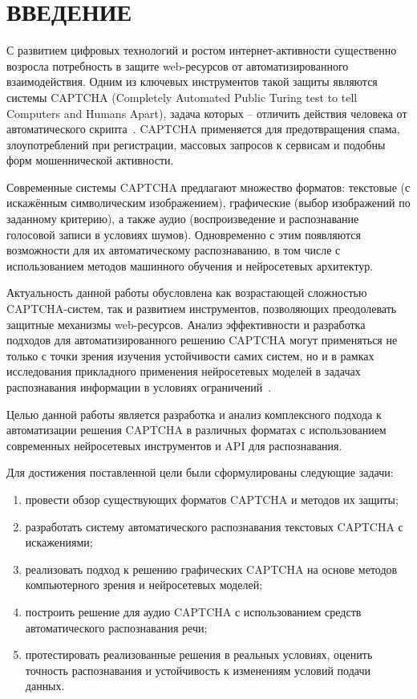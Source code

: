 \chapter*{ВВЕДЕНИЕ}

С развитием цифровых технологий и ростом интернет-активности существенно возросла 
потребность в защите web-ресурсов от автоматизированного взаимодействия. Одним 
из ключевых инструментов такой защиты являются системы CAPTCHA (Completely 
Automated Public Turing test to tell Computers and Humans Apart), задача которых 
-- отличить действия человека от автоматического скрипта~\cite{captchawiki}. 
CAPTCHA применяется для предотвращения спама, злоупотреблений при регистрации, 
массовых запросов к сервисам и подобны форм мошеннической активности.

Современные системы CAPTCHA предлагают множество форматов: текстовые (с 
искажённым символическим изображением), графические (выбор изображений по 
заданному критерию), а также аудио (воспроизведение и распознавание голосовой 
записи в условиях шумов). Одновременно с этим появляются возможности для их 
автоматическому распознаванию, в том числе с использованием методов 
машинного обучения и нейросетевых архитектур.

Актуальность данной работы обусловлена как возрастающей сложностью 
CAPTCHA-систем, так и развитием инструментов, позволяющих преодолевать защитные 
механизмы web-ресурсов. Анализ эффективности и разработка подходов для 
автоматизированного решению CAPTCHA могут применяться не только с точки зрения 
изучения устойчивости самих систем, но и в рамках исследования прикладного 
применения нейросетевых моделей в задачах распознавания информации в условиях 
ограничений~\cite{captchatrouble2}.

Целью данной работы является разработка и анализ комплексного подхода к 
автоматизации решения CAPTCHA в различных форматах с использованием современных 
нейросетевых инструментов и API для распознавания.

Для достижения поставленной цели были сформулированы следующие задачи:

\begin{enumerate}
    \item провести обзор существующих форматов CAPTCHA и методов их защиты;
    \item разработать систему автоматического распознавания текстовых CAPTCHA с 
    искажениями;
    \item реализовать подход к решению графических CAPTCHA на основе методов 
    компьютерного зрения и нейросетевых моделей;
    \item построить решение для аудио CAPTCHA с использованием средств 
    автоматического распознавания речи;
    \item протестировать реализованные решения в реальных условиях, оценить 
    точность распознавания и устойчивость к изменениям условий подачи данных.
\end{enumerate}
